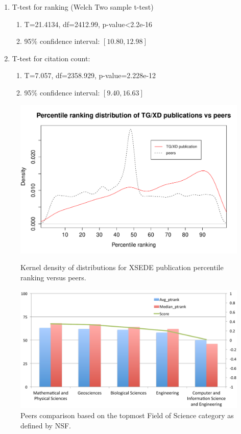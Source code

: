 \documentclass{sig-alternate}
\begin{document}
\begin{enumerate}
\item T-test for ranking (Welch Two sample t-test)
\begin{enumerate}
\item T=21.4134, df=2412.99, p-value<2.2e-16
\item 95\% confidence interval: $[10.80, 12.98]$
\end{enumerate}
\item T-test for citation count:
\begin{enumerate}
\item T=7.057, df=2358.929, p-value=2.228e-12
\item 95\% confidence interval: $[9.40, 16.63]$
\end{enumerate}
\end{enumerate}
 

\begin{figure}[htb!]
  \centering 
    \includegraphics[width=1.0\columnwidth]{images-new/xd_peers_density.pdf} 
  \caption{Kernel density of distributions for XSEDE publication percentile ranking versus peers.}\label{F:xd_peers_density} 

    \includegraphics[width=1.0\columnwidth]{images-new/c.pdf} 
  \caption{Peers comparison based on the topmost Field of Science category as defined by NSF.}\label{F:xsede-top-c} 


\end{figure} 
\end{document}
